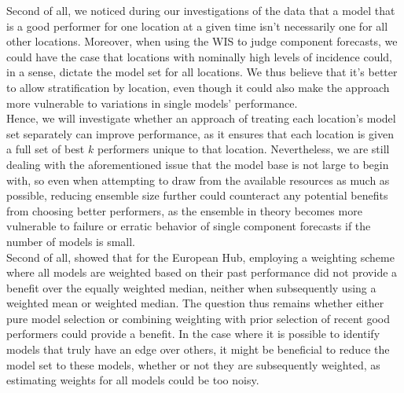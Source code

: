 Second of all, we noticed during our investigations of the data that a model that is a good performer for one location at a given time isn't necessarily one for all other locations. Moreover, when using the WIS to judge component forecasts, we could have the case that locations with nominally high levels of incidence could, in a sense, dictate the model set for all locations. We thus believe that it's better to allow stratification by location, even though it could also make the approach more vulnerable to variations in single models' performance. \\
Hence, we will investigate whether an approach of treating each location's model set separately can improve performance, as it ensures that each location is given a full set of best $k$ performers unique to that location. Nevertheless, we are still dealing with the aforementioned issue that the model base is not large to begin with, so even when attempting to draw from the available resources as much as possible, reducing ensemble size further could counteract any potential benefits from choosing better performers, as the ensemble in theory becomes more vulnerable to failure or erratic behavior of single component forecasts if the number of models is small. \medskip\\%
Second of all, \cite{sherratt_european_2022} showed that for the European Hub, employing a weighting scheme where all models are weighted based on their past performance did not provide a benefit over the equally weighted median, neither when subsequently using a weighted mean or weighted median. The question thus remains whether either pure model selection or combining weighting with prior selection of recent good performers could provide a benefit. In the case where it is possible to identify models that truly have an edge over others, it might be beneficial to reduce the model set to these models, whether or not they are subsequently weighted, as estimating weights for all models could be too noisy.\\ %
